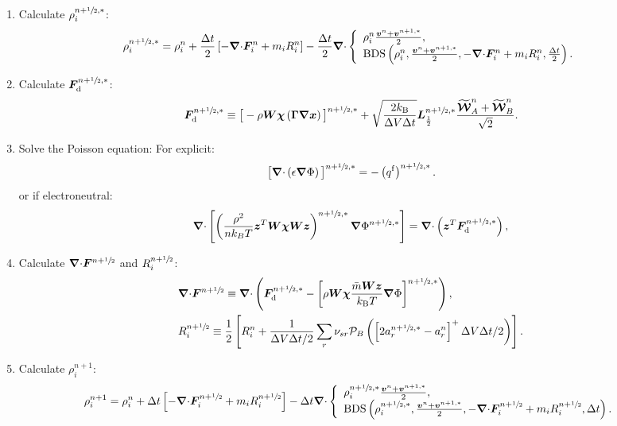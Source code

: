 \documentclass[
10pt
showpacs, showkeys,
amsmath,amssymb,
aps,
pre,
floatfix,
]{revtex4-1}
\newcommand{\divg}{{\V\nabla\cdot}}                       %
\begin{document}
\begin{enumerate}
\item Calculate $\rho^{n+\sfrac{1}{2},*}_i$:
\begin{equation}
\rho^{n+\myhalf,*}_i = \rho^n_i + \frac{\D{t}}{2} \left[ -\divg\V{F}^n_i + m_i R^n_i \right]
-\frac{\D{t}}{2}\divg
\left\{
\begin{array}{l}
\rho^n_i \frac{\V{v}^n+\V{v}^{n+1,*}}{2}, \\
\mathrm{BDS}\left(\rho_i^n,\frac{\V{v}^n+\V{v}^{n+1,*}}{2},-\divg\V{F}_i^n+m_i R_i^n,\frac{\D{t}}{2}\right).
\end{array}
\right.
\end{equation}

\item Calculate $\boldsymbol{F}_\mathrm{d}^{n+\sfrac{1}{2},*}$:
\begin{equation}
\boldsymbol{F}_\mathrm{d}^{n+\sfrac{1}{2},*} \equiv \big[-\rho\boldsymbol{W}\boldsymbol{\chi}\left(\boldsymbol{\Gamma}\boldsymbol{\nabla}\boldsymbol{x}\right)\big]^{n+\sfrac{1}{2},*} +
\sqrt{ \frac{2k_\mathrm{B}}{\Delta V\Delta t} } \boldsymbol{L}^{n+\sfrac{1}{2},*}_{\frac12} \frac{\widetilde{\boldsymbol{\mathcal{W}}}_A^n+\widetilde{\boldsymbol{\mathcal{W}}}_B^n}{\sqrt{2}}.
\end{equation}

\item Solve the Poisson equation:
For explicit:
\begin{equation}
\big[\divg\left(\epsilon\grad\Phi\right)\big]^{n+\myhalf,*} = - \left(q^\mathrm{f}\right)^{n+\myhalf,*}.
\end{equation}
or if electroneutral:
\begin{equation}
 \divg \left[ \left(\frac{\rho^2}{n k_B T} \V{z}^T \V{W} \V{\chi} \V{W} \V{z}\right)^{n+\myhalf,*} \grad \Phi^{n+\myhalf,*} \right] =
 \divg \left( \V{z}^T \V{F}_\mathrm{d}^{n+\myhalf,*} \right),
\end{equation}

\item Calculate $\divg\V{F}^{n+\myhalf}$ and $R^{n+\sfrac{1}{2}}_i$:
\begin{align}
&\divg\V{F}^{n+\myhalf} \equiv \divg\left(\V{F}_\mathrm{d}^{n+\myhalf,*} - \left[\rho\V{W}\V{\chi}\frac{\bar{m}\M{W}\V{z}}{k_\mathrm{B}T}\grad\Phi\right]^{n+\myhalf,*}\right),
\\
&R^{n+\myhalf}_i \equiv \frac{1}{2}\left[ R_i^n + \frac{1}{\D{V}\D{t}/2} \sum_r \nu_{sr} \mathcal{P}_B\left( \left[ 2 a^{n+\myhalf,*}_r - a^n_r \right]^+ \D{V}\D{t}/2 \right) \right].
\end{align}

\item Calculate $\rho^{n+1}_i$:
\begin{equation}
\rho^{n+1}_i = \rho^n_i + \D{t} \left[ -\divg\V{F}^{n+\myhalf}_i + m_i R^{n+\myhalf}_i \right]
- \D{t}\divg
\left\{
\begin{array}{l}
\rho^{n+\myhalf,*}_i \frac{\V{v}^n + \V{v}^{n+1,*}}{2}, \\
\mathrm{BDS}\left(\rho_i^{n+\myhalf,*},\frac{\V{v}^n+\V{v}^{n+1,*}}{2},-\divg\V{F}^{n+\myhalf}_i+m_i R_i^{n+\myhalf},\D{t}\right).
\end{array}
\right.
\end{equation} 


\end{enumerate}
\end{document}

